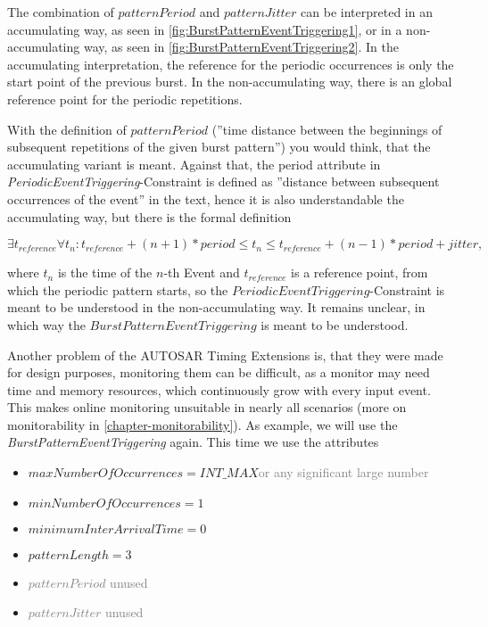 The combination of $patternPeriod$ and $patternJitter$ can be interpreted in an accumulating way, as seen in \ref{fig:BurstPatternEventTriggering1}, or in a non-accumulating way, as seen in \ref{fig:BurstPatternEventTriggering2}. In the accumulating interpretation, the reference for the periodic occurrences is only the start point of the previous burst. In the non-accumulating way, there is an global reference point for the periodic repetitions.

With the definition of $patternPeriod$ (''time distance between the beginnings of subsequent repetitions of the given burst pattern''\cite{TIMEX}) you would think, that the accumulating variant is meant. Against that, the period attribute in \textit{PeriodicEventTriggering}-Constraint is defined as ''distance between subsequent occurrences of the event''\cite{TIMEX} in the text, hence it is also understandable the accumulating way, but there is the formal definition

\begin{math}
\exists t_{reference}\forall t_n: t_{reference}+(n+1)*period\leq t_n\leq t_{reference}+(n-1)*period+jitter,
\end{math}

where $t_n$ is the time of the $n$-th Event and $t_{reference}$ is a reference point, from which the periodic pattern starts, so the $PeriodicEventTriggering$-Constraint is meant to be understood in the non-accumulating way. It remains unclear, in which way the $BurstPatternEventTriggering$ is meant to be understood.

Another problem of the AUTOSAR Timing Extensions is, that they were made for design purposes, monitoring them can be difficult, as a monitor may need time and memory resources, which continuously grow with every input event. This makes online monitoring unsuitable in nearly all scenarios (more on monitorability in \ref{chapter-monitorability}). As example, we will use the \textit{BurstPatternEventTriggering} again. This time we use the attributes
\begin{itemize}
	\item
	$maxNumberOfOccurrences = INT\_MAX$\textcolor{gray}{or any significant large number}
	\item
	$minNumberOfOccurrences = 1$
	\item
	$minimumInterArrivalTime = 0$
	\item
	$patternLength = 3$
	\item
	\textcolor{gray}{$patternPeriod$} \textcolor{gray}{unused}
	\item
	\textcolor{gray}{$patternJitter$} \textcolor{gray}{unused}
\end{itemize}

